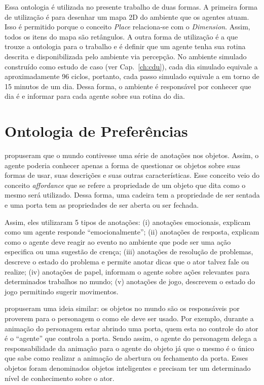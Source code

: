 Essa ontologia é utilizada no presente trabalho de duas formas. A primeira
forma de utilização é para desenhar um mapa 2D do ambiente que os agentes
atuam. Isso é permitido porque o conceito \emph{Place} relaciona-se com o
\emph{Dimension}. Assim, todos os itens do mapa são retângulos. A outra forma
de utilização é a que trouxe a ontologia para o trabalho e é definir que um
agente tenha sua rotina descrita e disponibilizada pelo ambiente via
percepção. No ambiente simulado construído como estudo de caso (ver
Cap.~\ref{ch:cdu}), cada dia simulado equivale a
aproximadamente 96 ciclos, portanto, cada passo simulado equivale a em torno
de 15 minutos de um dia. Dessa forma, o ambiente é responsável por conhecer
que dia é e informar para cada agente sobre sua rotina do dia.

\section{Ontologia de Preferências} \label{ch:aec:oda}

\citet{doyle1998annotated} propuseram que o mundo contivesse uma série de
anotações nos objetos. Assim, o agente poderia conhecer apenas a forma de
questionar os objetos sobre suas formas de usar, suas descrições e suas outras
características. Esse conceito veio do conceito \emph{affordance} que se
refere a propriedade de um objeto que dita como o mesmo será utilizado.
Dessa forma, uma cadeira tem a propriedade de ser sentada e uma porta tem as
propriedades de ser aberta ou ser fechada.

Assim, eles utilizaram 5 tipos de anotações: (i) anotações emocionais,
explicam como um agente responde ``emocionalmente''; (ii) anotações de
resposta, explicam como o agente deve reagir ao evento no ambiente que pode ser
uma ação especifica ou uma sugestão de crença; (iii) anotações de resolução de
problemas, descreve o estado do problema e permite anotar dicas que o ator
talvez fale ou realize; (iv) anotações de papel, informam o agente sobre ações
relevantes para determinados trabalhos no mundo; (v) anotações de jogo,
descrevem o estado do jogo permitindo sugerir movimentos.

\citet{kallmann1999modeling} propuseram uma ideia similar: os objetos no mundo
são os responsáveis por proverem para o personagem o como ele deve ser usado.
Por exemplo, durante a animação do personagem estar abrindo uma porta, quem esta
no controle do ator é o ``agente'' que controla a porta. Sendo assim, o agente do
personagem delega a responsabilidade da animação para o agente do objeto já
que o mesmo é o único que sabe como realizar a animação de abertura ou
fechamento da porta. Esses objetos foram denominados objetos inteligentes e precisam
ter um determinado nível de conhecimento sobre o ator.

